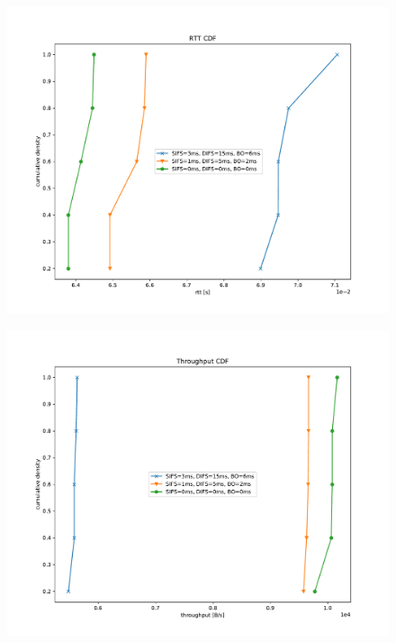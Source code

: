 \documentclass{article}
\begin{document}
\begin{figure}
	\includegraphics[width=\textwidth]{cdf/rtt_cdf}
\end{figure}

\begin{figure}
	\includegraphics[width=\textwidth]{cdf/throughput_cdf}
\end{figure}
\end{document}
